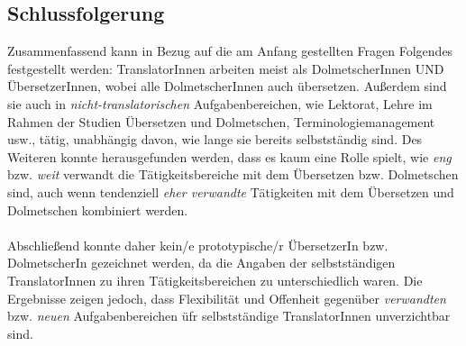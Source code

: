 \documentclass{article}
\begin{document}
	\subsection*{Schlussfolgerung}
	Zusammenfassend kann in Bezug auf die am Anfang gestellten Fragen Folgendes festgestellt werden: TranslatorInnen arbeiten meist als DolmetscherInnen UND ÜbersetzerInnen, wobei alle DolmetscherInnen auch übersetzen. Außerdem sind sie auch in \textit{nicht-translatorischen} Aufgabenbereichen, wie Lektorat, Lehre im Rahmen der Studien Übersetzen und Dolmetschen, Terminologiemanagement usw., tätig, unabhängig davon, wie lange sie bereits selbstständig sind. Des Weiteren konnte herausgefunden werden, dass es kaum eine Rolle spielt, wie \textit{eng} bzw. \textit{weit} verwandt die Tätigkeitsbereiche mit dem Übersetzen bzw. Dolmetschen sind, auch wenn tendenziell \textit{eher verwandte} Tätigkeiten mit dem Übersetzen und Dolmetschen kombiniert werden. \\ \\
	Abschließend konnte daher kein/e prototypische/r ÜbersetzerIn bzw. DolmetscherIn gezeichnet werden, da die Angaben der selbstständigen TranslatorInnen zu ihren Tätigkeitsbereichen zu unterschiedlich waren. Die Ergebnisse zeigen jedoch, dass Flexibilität und Offenheit gegenüber \textit{verwandten} bzw. \textit{neuen} Aufgabenbereichen üfr selbstständige TranslatorInnen unverzichtbar sind.

	
\end{document}
